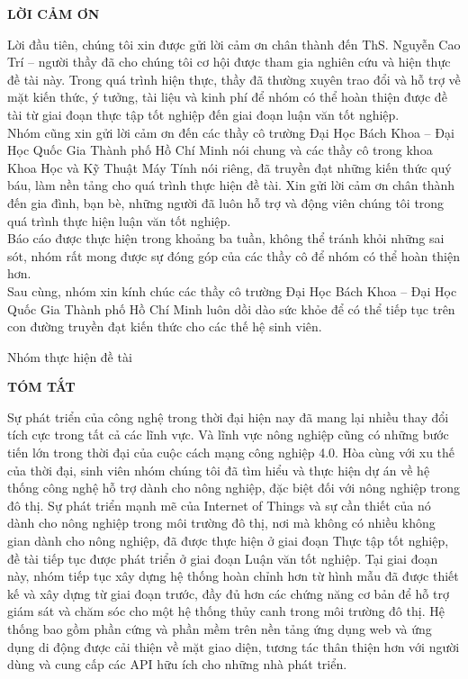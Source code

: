 \documentclass[a4paper,12pt,oneside]{article}
\begin{document}
\newpage
\begin{center}
{\fontsize{20pt}{1}\selectfont \textbf{LỜI CẢM ƠN}}\\[1cm]
\end{center}
\noindent Lời đầu tiên, chúng tôi xin được gửi lời cảm ơn chân thành đến ThS. Nguyễn Cao Trí – người thầy đã cho chúng tôi cơ hội được tham gia nghiên cứu và hiện thực đề tài này. Trong quá trình hiện thực, thầy đã thường xuyên trao đổi và hỗ trợ về mặt kiến thức, ý tưởng, tài liệu và kinh phí để nhóm có thể hoàn thiện được đề tài từ giai đoạn thực tập tốt nghiệp đến giai đoạn luận văn tốt nghiệp. \\
\noindent Nhóm cũng xin gửi lời cảm ơn đến các thầy cô trường Đại Học Bách Khoa – Đại Học Quốc Gia Thành phố Hồ Chí Minh nói chung và các thầy cô trong khoa Khoa Học và Kỹ Thuật Máy Tính nói riêng, đã truyền đạt những kiến thức quý báu, làm nền tảng cho quá trình thực hiện đề tài.
Xin gửi lời cảm ơn chân thành đến gia đình, bạn bè, những người đã luôn hỗ trợ và động viên chúng tôi trong quá trình thực hiện luận văn tốt nghiệp. \\
\noindent Báo cáo được thực hiện trong khoảng ba tuần, không thể tránh khỏi những sai sót, nhóm rất mong được sự đóng góp của các thầy cô để nhóm có thể hoàn thiện hơn.\\
\noindent Sau cùng, nhóm xin kính chúc các thầy cô trường Đại Học Bách Khoa – Đại Học Quốc Gia Thành phố Hồ Chí Minh luôn dồi dào sức khỏe để có thể tiếp tục trên con đường truyền đạt kiến thức cho các thế hệ sinh viên.

\begin{flushright}
Nhóm thực hiện đề tài
\end{flushright}
\newpage
\begin{center}
{\fontsize{20pt}{1}\selectfont \textbf{TÓM TẮT}}\\[1cm]
\end{center}
Sự phát triển của công nghệ trong thời đại hiện nay đã  mang lại nhiều thay đổi tích cực trong tất cả các lĩnh vực. Và lĩnh vực nông nghiệp cũng có những bước tiến lớn trong thời đại của cuộc cách mạng công nghiệp 4.0. Hòa cùng với xu thế của thời đại, sinh viên nhóm chúng tôi đã tìm hiểu và thực hiện dự án về hệ thống công nghệ hỗ trợ dành cho nông nghiệp, đặc biệt đối với nông nghiệp trong đô thị. Sự phát triển mạnh mẽ của Internet of Things và sự cần thiết của nó dành cho nông nghiệp trong môi trường đô thị, nơi mà không có nhiều không gian dành cho nông nghiệp, đã được thực hiện ở giai đoạn Thực tập tốt nghiệp, đề tài tiếp tục được phát triển ở giai đoạn Luận văn tốt nghiệp. Tại giai đoạn này, nhóm tiếp tục xây dựng hệ thống hoàn chỉnh hơn từ hình mẫu đã được thiết kế và xây dựng từ giai đoạn trước, đầy đủ hơn các chứng năng cơ bản để hỗ trợ giám sát và chăm sóc cho một hệ thống thủy canh trong môi trường đô thị. Hệ thống bao gồm phần cứng và phần mềm trên nền tảng ứng dụng web và ứng dụng di động được cải thiện về mặt giao diện, tương tác thân thiện hơn với người dùng và cung cấp các API hữu ích cho những nhà phát triển.
\end{document}
